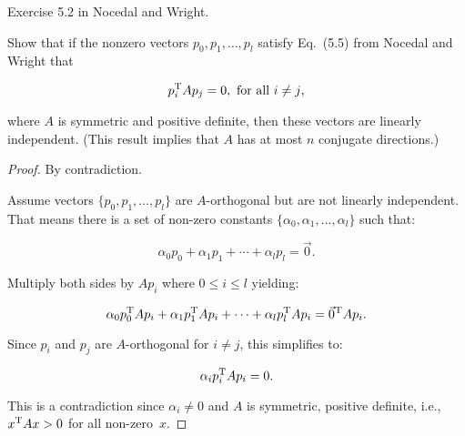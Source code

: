 \begin{problem}
  Exercise 5.2 in Nocedal and Wright.

  Show that if the nonzero vectors $p_0,p_1,\ldots,p_l$ satisfy Eq.~(5.5) from Nocedal and Wright that
  
  \[p_i^{\textnormal{T}} A p_{j} = 0, \textnormal{ for all } i \ne j\text{,}\]
  
  \noindent
  where $A$ is symmetric and positive definite, then these vectors are linearly independent. (This result implies that $A$ has at most $n$ conjugate directions.)
\end{problem}

\begin{proof} 
  By contradiction.  
  
  Assume vectors $\{p_0,p_1,\ldots,p_l\}$ are $A$-orthogonal but are not linearly independent.  That means there is a set of non-zero constants $\{\alpha_0,\alpha_1,\ldots,\alpha_{l}\}$ such that:
  
  \[ \alpha_{0}p_{0} + \alpha_{1}p_{1} + \cdots +\alpha_{l}p_{l} = \vec{0} \text{.}\]
  
  \noindent
  Multiply both sides by $Ap_i$ where $0\leq i \leq l$ yielding:
  
  \[ \alpha_{0}p_{0}^{\textnormal{T}} Ap_{i} + \alpha_{1}p_{1}^{\textnormal{T}} Ap_{i} + \cdots +\alpha_{l}p_{l}^{\textnormal{T}} Ap_{i} = \vec{0}^{\textnormal{T}} Ap_{i} \text{.}\]
  
  \noindent
  Since $p_{i}$ and $p_{j}$ are $A$-orthogonal for ${i\ne j}$, this simplifies to:
  
  \[ \alpha_{i}p_{i}^{\textnormal{T}} Ap_{i} = 0 \text{.}\]
  
  \noindent 
  This is a contradiction since ${\alpha_i \ne 0}$ and $A$ is symmetric, positive definite, i.e.,~${x^{\textnormal{T}} A x > 0}$ for all non-zero~$x$.
\end{proof}
